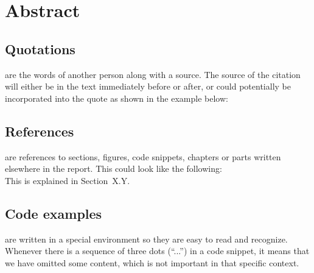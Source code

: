 
\begingroup
\let\clearpage\relax
\let\cleardoublepage\relax
\let\cleardoublepage\relax

\chapter*{Abstract} %






\section{Quotations} are the words of another person along with a source.
The source of the citation will either be in the text immediately before or after, or could potentially be incorporated into the quote as shown in the example below: \\


\section{References} are references to sections, figures, code snippets, chapters or parts written elsewhere in the report. 
This could look like the following:\\

This is explained in Section~X.Y.

\section{Code examples} are written in a special environment so they are easy to read and recognize. 
Whenever there is a sequence of three dots (``...'') in a code snippet, it means that we have omitted some content, which is not important in that specific context.

%



\endgroup			

\vfill

